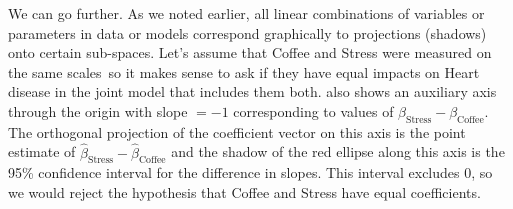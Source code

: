 
We can go further.  As we noted earlier, all linear combinations of variables or parameters
in data or models correspond graphically to projections (shadows) onto certain sub-spaces.
Let's assume that Coffee and Stress were measured on the same scales\, so it makes sense
to ask if they have equal impacts on Heart disease in the joint model that includes them both.
 also shows an auxiliary axis through the origin with slope $=-1$
corresponding to values of $\beta_{\mathrm{Stress}} - \beta_{\mathrm{Coffee}}$. The orthogonal
projection of the coefficient vector on this axis is the point estimate of
$\widehat{\beta}_{\mathrm{Stress}} - \widehat{\beta}_{\mathrm{Coffee}}$
and the shadow of the red ellipse along this axis is the 95\% confidence interval
for the difference in slopes. This interval excludes 0, so we would reject the hypothesis
that Coffee and Stress have equal coefficients.

